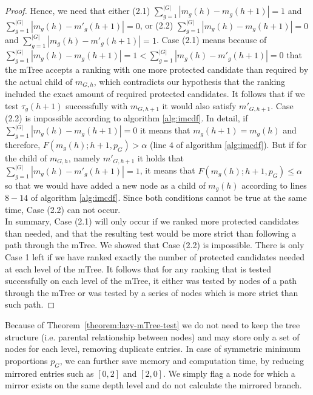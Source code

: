 \begin{proof}
	Hence, we need that either
	(2.1) $\sum_{g=1}^{|G|} |m_{g}(h) - m_g(h+1)| = 1$ and $\sum_{g=1}^{|G|} |m_{g}(h) - m'_g(h+1)| = 0$,
	or
	(2.2) $\sum_{g=1}^{|G|} |m_{g}(h) - m_g(h+1)| = 0$ and $\sum_{g=1}^{|G|} |m_{g}(h) - m'_g(h+1)| = 1$.
	Case (2.1) means because of $\sum_{g=1}^{|G|} |m_{g}(h) - m_g(h+1)| = 1 < \sum_{g=1}^{|G|} |m_{g}(h) - m'_g(h+1)| = 0$ that the mTree accepts a ranking with one more protected candidate than required by the actual child of $m_{G,h}$, which contradicts our hypothesis that the ranking included the exact amount of required protected candidates. It follows that if we test $\tau_g (h+1)$ successfully with $m_{G,h+1}$ it would also satisfy ${m'}_{G,h+1}$.
Case (2.2) is impossible according to algorithm \ref{alg:imcdf}.
In detail, if $\sum_{g=1}^{|G|} |m_{g}(h) - m_g(h+1)| = 0$ it means that $ m_g(h+1) = m_{g}(h)$ and therefore, $F(m_{g}(h);h+1,p_G) > \alpha$ (line $4$ of algorithm \ref{alg:imcdf}). But if for the child of $m_{G,h}$, namely ${m'}_{G,h+1}$ it holds that $\sum_{g=1}^{|G|} |m_{g}(h) - m'_g(h+1)| = 1$, it means that
$F(m_{g}(h);h+1,p_G) \leq \alpha$ so that we would have added a new node as a child of $m_{g}(h)$ according to lines  $8-14$ of algorithm \ref{alg:imcdf}. Since both conditions cannot be true at the same time, Case (2.2) can not occur.
\\
In summary, Case (2.1) will only occur if we ranked more protected candidates than needed, and that the resulting test would be more strict than following a path through the mTree.
%
We showed that Case (2.2) is impossible. There is only Case 1 left if we have ranked exactly the number of protected candidates needed at each level of the mTree.
%
It follows that for any ranking that is tested successfully on each level of the mTree, it either was tested by nodes of a path through the mTree or was tested by a series of nodes which is more strict than such path.
\end{proof}
%
\noindent Because of Theorem~\ref{theorem:lazy-mTree-test} we do not need to keep the tree structure (i.e. parental relationship between nodes) and may store only a set of nodes for each level, removing duplicate entries.
%
In case of symmetric minimum proportions $p_G$, we can further save memory and computation time, by reducing mirrored entries such as $[0,2]$ and $[2,0]$.
%
We simply flag a node for which a mirror exists on the same depth level and do not calculate the mirrored branch.

